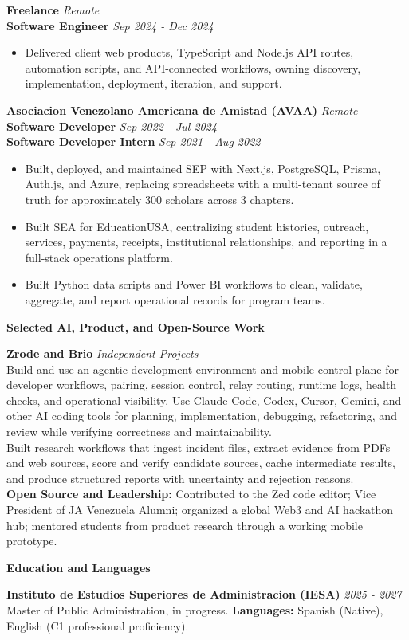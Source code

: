 \documentclass[10pt]{article}
\newcommand{\sectiontitle}[1]{%
    \vspace{4pt}
    \begin{center}
        \textbf{#1}
    \end{center}
    \vspace{-5pt}
}
\begin{document}
\vspace{2pt}
\textbf{Freelance} \hfill \textit{Remote} \\
\textbf{Software Engineer} \hfill \textit{Sep 2024 - Dec 2024}
\begin{itemize}
    \item Delivered client web products, TypeScript and Node.js API routes, automation scripts, and API-connected workflows, owning discovery, implementation, deployment, iteration, and support.
\end{itemize}

\vspace{2pt}
\textbf{Asociacion Venezolano Americana de Amistad (AVAA)} \hfill \textit{Remote} \\
\textbf{Software Developer} \hfill \textit{Sep 2022 - Jul 2024} \\
\textbf{Software Developer Intern} \hfill \textit{Sep 2021 - Aug 2022}
\begin{itemize}
    \item Built, deployed, and maintained SEP with Next.js, PostgreSQL, Prisma, Auth.js, and Azure, replacing spreadsheets with a multi-tenant source of truth for approximately 300 scholars across 3 chapters.
    \item Built SEA for EducationUSA, centralizing student histories, outreach, services, payments, receipts, institutional relationships, and reporting in a full-stack operations platform.
    \item Built Python data scripts and Power BI workflows to clean, validate, aggregate, and report operational records for program teams.
\end{itemize}

\sectiontitle{Selected AI, Product, and Open-Source Work}
\textbf{Zrode and Brio} \hfill \textit{Independent Projects} \\
Build and use an agentic development environment and mobile control plane for developer workflows, pairing, session control, relay routing, runtime logs, health checks, and operational visibility. Use Claude Code, Codex, Cursor, Gemini, and other AI coding tools for planning, implementation, debugging, refactoring, and review while verifying correctness and maintainability. \\
Built research workflows that ingest incident files, extract evidence from PDFs and web sources, score and verify candidate sources, cache intermediate results, and produce structured reports with uncertainty and rejection reasons. \\
\textbf{Open Source and Leadership:} Contributed to the Zed code editor; Vice President of JA Venezuela Alumni; organized a global Web3 and AI hackathon hub; mentored students from product research through a working mobile prototype.

\sectiontitle{Education and Languages}
\textbf{Instituto de Estudios Superiores de Administracion (IESA)} \hfill \textit{2025 - 2027} \\
Master of Public Administration, in progress. \textbf{Languages:} Spanish (Native), English (C1 professional proficiency).
\end{document}
